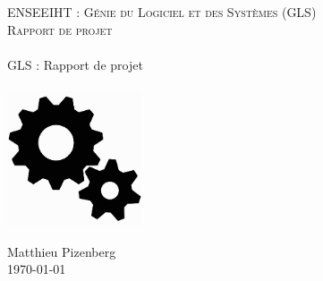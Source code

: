 \begin{titlepage}
\begin{center}

   \textsc{\Large ENSEEIHT : Génie du Logiciel et des Systèmes (GLS)}\\[6cm]
\textsc{\large Rapport de projet}\\
\HRule \\
\huge{GLS : Rapport de projet\\}
\HRule \\[3cm]
\includegraphics[height=4cm]{../Images/gears.pdf}
\vfill

\LARGE{Matthieu Pizenberg}\\[1em]
\large{\today}

\end{center}
\end{titlepage}
